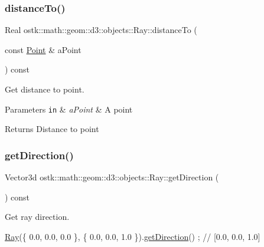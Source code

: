 \subsubsection{\texorpdfstring{distance\+To()}{distanceTo()}}
{\footnotesize\ttfamily Real ostk\+::math\+::geom\+::d3\+::objects\+::\+Ray\+::distance\+To (\begin{DoxyParamCaption}\item[{const \hyperlink{classostk_1_1math_1_1geom_1_1d3_1_1objects_1_1_point}{Point} \&}]{a\+Point }\end{DoxyParamCaption}) const}



Get distance to point. 


\begin{DoxyParams}[1]{Parameters}
\mbox{\tt in}  & {\em a\+Point} & A point \\
\hline
\end{DoxyParams}
\begin{DoxyReturn}{Returns}
Distance to point 
\end{DoxyReturn}
\mbox{\label{classostk_1_1math_1_1geom_1_1d3_1_1objects_1_1_ray_a986aa3d13740b411f72115503b1c9a72}} 
\subsubsection{\texorpdfstring{get\+Direction()}{getDirection()}}
{\footnotesize\ttfamily Vector3d ostk\+::math\+::geom\+::d3\+::objects\+::\+Ray\+::get\+Direction (\begin{DoxyParamCaption}{ }\end{DoxyParamCaption}) const}



Get ray direction. 


\begin{DoxyCode}
\hyperlink{classostk_1_1math_1_1geom_1_1d3_1_1objects_1_1_ray_a78335698f8a4f72e613e607b13121df0}{Ray}(\{ 0.0, 0.0, 0.0 \}, \{ 0.0, 0.0, 1.0 \}).\hyperlink{classostk_1_1math_1_1geom_1_1d3_1_1objects_1_1_ray_a986aa3d13740b411f72115503b1c9a72}{getDirection}() ; \textcolor{comment}{// [0.0, 0.0, 1.0]}
\end{DoxyCode}


